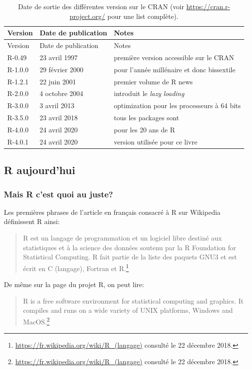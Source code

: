 \documentclass[]{article}
\begin{document}
\begin{longtable}[]{@{}lll@{}}
\caption{Date de sortie des différentes version sur le CRAN (voir \url{https://cran.r-project.org/} pour une list complète).}\tabularnewline
\toprule
Version & Date de publication & Notes\tabularnewline
\midrule
\endfirsthead
\toprule
Version & Date de publication & Notes\tabularnewline
\midrule
\endhead
R-0.49 & 23 avril 1997 & première version accessible sur le CRAN\tabularnewline
R-1.0.0 & 29 février 2000 & pour l'année millénaire et donc bissextile\tabularnewline
R-1.2.1 & 22 juin 2001 & premier volume de R news\tabularnewline
R-2.0.0 & 4 octobre 2004 & introduit le \emph{lazy loading}\tabularnewline
R-3.0.0 & 3 avril 2013 & optimization pour les processeurs à 64 bits\tabularnewline
R-3.5.0 & 23 avril 2018 & tous les packages sont\tabularnewline
R-4.0.0 & 24 avril 2020 & pour les 20 ans de R\tabularnewline
R-4.0.1 & 24 avril 2020 & version utilisée pour ce livre\tabularnewline
\bottomrule
\end{longtable}

\hypertarget{r-aujourdhui}{%
\subsection{R aujourd'hui}\label{r-aujourdhui}}

\hypertarget{mais-r-cest-quoi-au-juste}{%
\subsubsection{Mais R c'est quoi au juste?}\label{mais-r-cest-quoi-au-juste}}

Les premières phrases de l'article en français consacré à R sur Wikipedia définissent R ainsi:

\begin{quote}
R est un langage de programmation et un logiciel libre destiné aux statistiques et à la science des données soutenu par la R Foundation for Statistical Computing. R fait partie de la liste des paquets GNU3 et est écrit en C (langage), Fortran et R.\footnote{\url{https://fr.wikipedia.org/wiki/R_(langage)} consulté le 22 décembre 2018.}
\end{quote}

De même sur la page du projet R, on peut lire:

\begin{quote}
R is a free software environment for statistical computing and graphics. It compiles and runs on a wide variety of UNIX platforms, Windows and MacOS.\footnote{\url{https://fr.wikipedia.org/wiki/R_(langage)} consulté le 22 décembre 2018.}
\end{quote}
\end{document}
